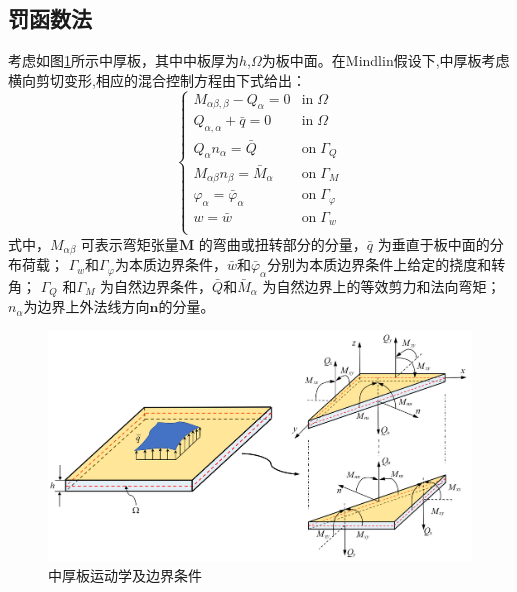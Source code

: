 \subsection{罚函数法}
考虑如图\ref{mindlin_picture}所示中厚板，其中中板厚为$h$,$\Omega$为板中面。在Mindlin假设下,中厚板考虑横向剪切变形,相应的混合控制方程由下式给出：
\begin{equation}\label{strong_mindlin}
    \begin{cases}
        M_{\alpha\beta,\beta} - Q_\alpha = 0 & \textrm{in}\; \Omega \\
        Q_{\alpha,\alpha} + \bar q = 0 & \textrm{in}\; \Omega \\    Q_\alpha n_\alpha = \bar Q & \textrm{on}\; \Gamma_Q \\
        M_{\alpha\beta} n_\beta = \bar M_\alpha & \textrm{on}\; \Gamma_M \\
        \varphi_\alpha = \bar \varphi_\alpha & \textrm{on}\; \Gamma_\varphi \\
        w = \bar w & \textrm{on}\; \Gamma_w \\
    \end{cases}
\end{equation}
式中，$M_{\alpha \beta}$ 可表示弯矩张量$\pmb{M}$ 的弯曲或扭转部分的分量，$\bar{q}$ 为垂直于板中面的分布荷载；
$\Gamma_w$和$\Gamma_\varphi$为本质边界条件，$\bar{w}$和$\bar{\varphi}_\alpha$分别为本质边界条件上给定的挠度和转角；
$\Gamma_Q$ 和$\Gamma_M$ 为自然边界条件，$\bar Q$和$\bar{M}_{\alpha}$ 为自然边界上的等效剪力和法向弯矩；
$n_\alpha$为边界上外法线方向$\pmb{n}$的分量。
\begin{figure}[H]
    \centering 
        \includegraphics[scale=0.5]{figures/shearlocking/Mindlinplate.png}
        \caption{中厚板运动学及边界条件}\label{mindlin_picture}
\end{figure}


